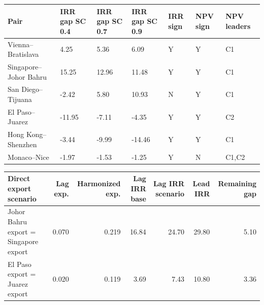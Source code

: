{\scriptsize
\begin{tabular}{@{}lllllll@{}}\toprule
Pair & IRR gap SC 0.4 & IRR gap SC 0.7 & IRR gap SC 0.9 & IRR sign & NPV sign & NPV leaders \\
\midrule
Vienna--Bratislava & 4.25 & 5.36 & 6.09 & Y & Y & C1 \\
Singapore--Johor Bahru & 15.25 & 12.96 & 11.48 & Y & Y & C1 \\
San Diego--Tijuana & -2.42 & 5.80 & 10.93 & N & Y & C1 \\
El Paso--Juarez & -11.95 & -7.11 & -4.35 & Y & Y & C2 \\
Hong Kong--Shenzhen & -3.44 & -9.99 & -14.46 & Y & Y & C1 \\
Monaco--Nice & -1.97 & -1.53 & -1.25 & Y & N & C1,C2 \\
\bottomrule
\end{tabular}

\vspace{0.45em}
\begin{tabular}{@{}lrrrrrr@{}}\toprule
Direct export scenario & Lag exp. & Harmonized exp. & Lag IRR base & Lag IRR scenario & Lead IRR & Remaining gap \\
\midrule
Johor Bahru export = Singapore export & 0.070 & 0.219 & 16.84 & 24.70 & 29.80 & 5.10 \\
El Paso export = Juarez export & 0.020 & 0.119 & 3.69 & 7.43 & 10.80 & 3.36 \\
\bottomrule
\end{tabular}
}
